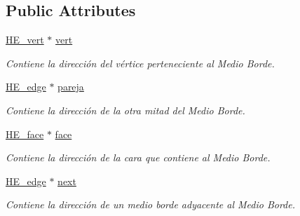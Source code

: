\subsection*{Public Attributes}
\begin{DoxyCompactItemize}
\item 
\hypertarget{class_h_e__edge_a0f2948558eb5c7e4c3b6d06df8c371d2}{\hyperlink{class_h_e__vert}{H\-E\-\_\-vert} $\ast$ \hyperlink{class_h_e__edge_a0f2948558eb5c7e4c3b6d06df8c371d2}{vert}}\label{class_h_e__edge_a0f2948558eb5c7e4c3b6d06df8c371d2}

\begin{DoxyCompactList}\small\item\em Contiene la dirección del vértice perteneciente al Medio Borde. \end{DoxyCompactList}\item 
\hypertarget{class_h_e__edge_abd18f9026e40fc0df490f3dd09554788}{\hyperlink{class_h_e__edge}{H\-E\-\_\-edge} $\ast$ \hyperlink{class_h_e__edge_abd18f9026e40fc0df490f3dd09554788}{pareja}}\label{class_h_e__edge_abd18f9026e40fc0df490f3dd09554788}

\begin{DoxyCompactList}\small\item\em Contiene la dirección de la otra mitad del Medio Borde. \end{DoxyCompactList}\item 
\hypertarget{class_h_e__edge_a64537a0992a9b54e9d254e7eec04f766}{\hyperlink{class_h_e__face}{H\-E\-\_\-face} $\ast$ \hyperlink{class_h_e__edge_a64537a0992a9b54e9d254e7eec04f766}{face}}\label{class_h_e__edge_a64537a0992a9b54e9d254e7eec04f766}

\begin{DoxyCompactList}\small\item\em Contiene la dirección de la cara que contiene al Medio Borde. \end{DoxyCompactList}\item 
\hypertarget{class_h_e__edge_aa002f397ba1ce28a16dc80ae30eb6a71}{\hyperlink{class_h_e__edge}{H\-E\-\_\-edge} $\ast$ \hyperlink{class_h_e__edge_aa002f397ba1ce28a16dc80ae30eb6a71}{next}}\label{class_h_e__edge_aa002f397ba1ce28a16dc80ae30eb6a71}

\begin{DoxyCompactList}\small\item\em Contiene la dirección de un medio borde adyacente al Medio Borde. \end{DoxyCompactList}\end{DoxyCompactItemize}


